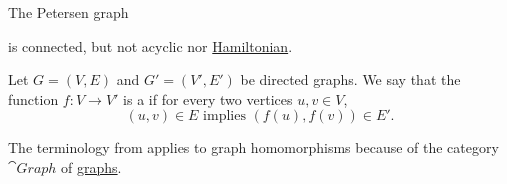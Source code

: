 \begin{example}\label{ex:petersen_graph}
  The Petersen graph
  \begin{alignedeq}\label{ex:petersen_graph/embedding}
    \iffalse\begin{mplibcode}
      u := 1cm;

      beginfig(1);
      input metapost/graphs;
      lax_bboxmargin := 2pt;

      for i = 1 upto 5:
      v[i] := thelabel("$\bullet$", dir(18 + i * 72) scaled u);
      v[5 + i] := thelabel("$\bullet$", dir(18 + i * 72) scaled 2u);
      endfor;

      for i = 1 upto 4:
      a[i] := straight_arc(v[5 + i], v[5 + i + 1]);
      a[5 + i] := straight_arc(v[i], v[5 + i]);
      endfor;

      a5 := straight_arc(v10, v6);
      a10 := straight_arc(v5, v10);

      a11 := straight_arc(v1, v3);
      a12 := straight_arc(v1, v4);
      a13 := straight_arc(v2, v4);
      a14 := straight_arc(v2, v5);
      a15 := straight_arc(v3, v5);

      draw_vertices(v);
      draw_edges(a);
      endfig;
    \end{mplibcode}\fi
  \end{alignedeq}
  is connected, but not acyclic nor \hyperref[def:graph_paths/hamiltonian_path]{Hamiltonian}.
\end{example}

\begin{definition}\label{def:graph_homomorphism}
  Let \( G = (V, E) \) and \( G' = (V', E') \) be directed graphs. We say that the function \( f: V \to V' \) is a  if for every two vertices \( u, v \in V \),
  \begin{equation*}
    (u, v) \in E \text{ implies } (f(u), f(v)) \in E'.
  \end{equation*}

  The terminology from  applies to graph homomorphisms because of the category \( \cat{Graph} \) of \hyperref[def:category_of_graphs]{graphs}.
\end{definition}

